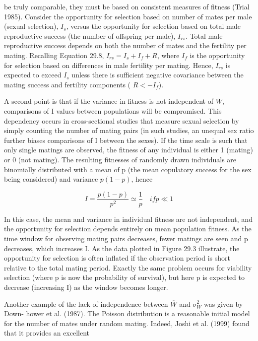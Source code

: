 \documentclass{article}
\begin{document}
be truly comparable, they must be based on consistent measures of fitness (Trial 1985). Consider the opportunity for selection based on number of mates per male (sexual selection),  $ I_{s} $, versus the opportunity for selection based on total male reproductive success (the number of offspring per male),  $ I_{rs} $. Total male reproductive success depends on both the number of mates and the fertility per mating. Recalling Equation 29.8,  $ I_{rs} = I_{s} + I_{f} + R $, where  $ I_{f} $ is the opportunity for selection based on differences in male fertility per mating. Hence,  $ I_{rs} $ is expected to exceed  $ I_{s} $ unless there is sufficient negative covariance between the mating success and fertility components ( $ R < -I_{f} $).

A second point is that if the variance in fitness is not independent of  $ \overline{W} $, comparisons of I values between populations will be compromised. This dependency occurs in cross-sectional studies that measure sexual selection by simply counting the number of mating pairs (in such studies, an unequal sex ratio further biases comparisons of I between the sexes). If the time scale is such that only single matings are observed, the fitness of any individual is either 1 (mating) or 0 (not mating). The resulting fitnesses of randomly drawn individuals are binomially distributed with a mean of p (the mean copulatory success for the sex being considered) and variance  $ p(1-p) $, hence

\begin{equation}
I=\frac{p(1-p)}{p^{2}}\simeq\frac{1}{p}\quad if p\ll1
\tag{29.10}
\label{eq:29_10}
\end{equation}

In this case, the mean and variance in individual fitness are not independent, and the opportunity for selection depends entirely on mean population fitness. As the time window for observing mating pairs decreases, fewer matings are seen and p decreases, which increases I. As the data plotted in Figure 29.3 illustrate, the opportunity for selection is often inflated if the observation period is short relative to the total mating period. Exactly the same problem occurs for viability selection (where p is now the probability of survival), but here p is expected to decrease (increasing I) as the window becomes longer.

Another example of the lack of independence between  $ \overline{W} $ and  $ \sigma_{W}^{2} $ was given by Down-
hower et al. (1987). The Poisson distribution is a reasonable initial model for the number of
mates under random mating. Indeed, Joshi et al. (1999) found that it provides an excellent
\end{document}
